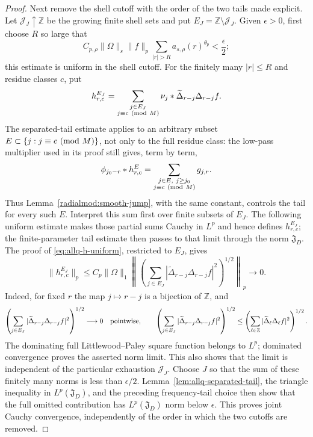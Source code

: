 \documentclass[11pt]{article}
\numberwithin{equation}{section}
\theoremstyle{remark}
\theoremstyle{definition}
\begin{document}
\begin{proof}
Next remove the shell cutoff with the order of the two tails made
explicit.  Let $\mathcal J_J\uparrow\mathbb Z$ be the growing finite shell
sets and put $E_J=\mathbb Z\setminus\mathcal J_J$.  Given $\epsilon>0$,
first choose $R$ so large that
\[
 C_{p,\rho}\|\Omega\|_s\|f\|_p
 \sum_{|r|>R}a_{s,\rho}(r)^{\theta_p}<\frac\epsilon2;
\]
this estimate is uniform in the shell cutoff.  For the finitely many
$|r|\le R$ and residue classes $c$, put
\[
 h_{r,c}^{E_J}=\sum_{\substack{j\in E_J\\j\equiv c\ ({\rm mod}\ M)}}
      \nu_j*\widetilde\Delta_{r-j}\Delta_{r-j}f.
\]
The separated-tail estimate applies to an arbitrary subset
$E\subset\{j:j\equiv c\ ({\rm mod}\ M)\}$, not only to the full residue
class: the low-pass multiplier used in its proof still gives, term by term,
\[
 \phi_{j_0-r}*h_{r,c}^{E}
 =\sum_{\substack{j\in E,\ j\ge j_0\\j\equiv c\ ({\rm mod}\ M)}}g_{j,r}.
\]
Thus Lemma~\ref{radialmod:smooth-jump}, with the same constant, controls
the tail for every such $E$.
Interpret this sum first over finite subsets of $E_J$.  The following
uniform estimate makes those partial sums Cauchy in $L^p$ and hence
defines $h_{r,c}^{E_J}$; the finite-parameter tail estimate then passes to
that limit through the norm $\mathfrak J_D$.
The proof of \eqref{eq:allq-h-uniform}, restricted to $E_J$, gives
\[
 \|h_{r,c}^{E_J}\|_p
 \le C_p\|\Omega\|_1
 \left\|\left(\sum_{j\in E_J}
       |\widetilde\Delta_{r-j}\Delta_{r-j}f|^2\right)^{1/2}\right\|_p
 \longrightarrow0.
\]
Indeed, for fixed $r$ the map $j\mapsto r-j$ is a bijection of
$\mathbb Z$, and
\[
 \left(\sum_{j\in E_J}|\widetilde\Delta_{r-j}\Delta_{r-j}f|^2\right)^{1/2}
 \longrightarrow0\quad\hbox{pointwise},\qquad
 \left(\sum_{j\in E_J}|\widetilde\Delta_{r-j}\Delta_{r-j}f|^2\right)^{1/2}
 \le \left(\sum_{\ell\in\mathbb Z}|\widetilde\Delta_\ell\Delta_\ell f|^2\right)^{1/2}.
\]
The dominating full Littlewood--Paley square function belongs to $L^p$;
dominated convergence proves the asserted norm limit.  This also shows
that the limit is independent of the particular exhaustion
$\mathcal J_J$.
Choose $J$ so that the sum of these finitely many norms is less than
$\epsilon/2$.  Lemma~\ref{lem:allq-separated-tail}, the triangle
inequality in $L^p(\mathfrak J_D)$, and the preceding frequency-tail
choice then show that the full omitted contribution has
$L^p(\mathfrak J_D)$ norm below $\epsilon$.  This proves joint Cauchy
convergence, independently of the order in which the two cutoffs are
removed.


\end{proof}
\end{document}
